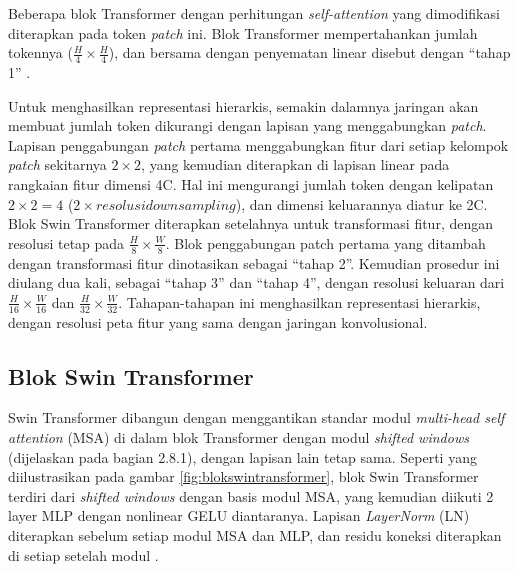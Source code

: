 Beberapa blok Transformer dengan perhitungan \emph{self-attention} yang dimodifikasi diterapkan pada token \emph{patch} ini. Blok Transformer mempertahankan jumlah tokennya 
(\begin{math}\frac{H}{4} \times \frac{H}{4}\end{math}), dan bersama dengan penyematan linear disebut dengan “tahap 1” \parencite{Liu2021}.

Untuk menghasilkan representasi hierarkis, semakin dalamnya jaringan akan membuat jumlah token dikurangi dengan lapisan yang menggabungkan \emph{patch}. Lapisan penggabungan \emph{patch} pertama menggabungkan 
fitur dari setiap kelompok \emph{patch} sekitarnya \begin{math}2 \times 2\end{math}, yang kemudian diterapkan di lapisan linear pada rangkaian fitur dimensi 4C. Hal ini mengurangi jumlah token dengan 
kelipatan \begin{math}2 \times 2 = 4\end{math} (\begin{math}2 \times resolusi downsampling\end{math}), dan dimensi keluarannya diatur ke 2C. Blok Swin Transformer diterapkan setelahnya untuk 
transformasi fitur, dengan resolusi tetap pada \begin{math}\frac{H}{8} \times \frac{W}{8}\end{math}. Blok penggabungan patch pertama yang ditambah dengan transformasi fitur dinotasikan sebagai 
“tahap 2”. Kemudian prosedur ini diulang dua kali, sebagai “tahap 3” dan “tahap 4”, dengan resolusi keluaran dari \begin{math}\frac{H}{16} \times \frac{W}{16}\end{math} dan 
\begin{math}\frac{H}{32} \times \frac{W}{32}\end{math}. Tahapan-tahapan ini menghasilkan representasi hierarkis, dengan resolusi peta fitur yang sama dengan jaringan konvolusional. \parencite{Liu2021}

\subsection{Blok Swin Transformer}

Swin Transformer dibangun dengan menggantikan standar modul \emph{multi-head self attention} (MSA) di dalam blok Transformer dengan modul \emph{shifted windows} (dijelaskan pada bagian 2.8.1), dengan 
lapisan lain tetap sama. Seperti yang diilustrasikan pada gambar \ref{fig:blokswintransformer}, blok Swin Transformer terdiri dari \emph{shifted windows} dengan basis modul MSA, yang kemudian diikuti 2 layer MLP dengan 
nonlinear GELU diantaranya. Lapisan \emph{LayerNorm} (LN) diterapkan sebelum setiap modul MSA dan MLP, dan residu koneksi diterapkan di setiap setelah modul \parencite{Liu2021}.

